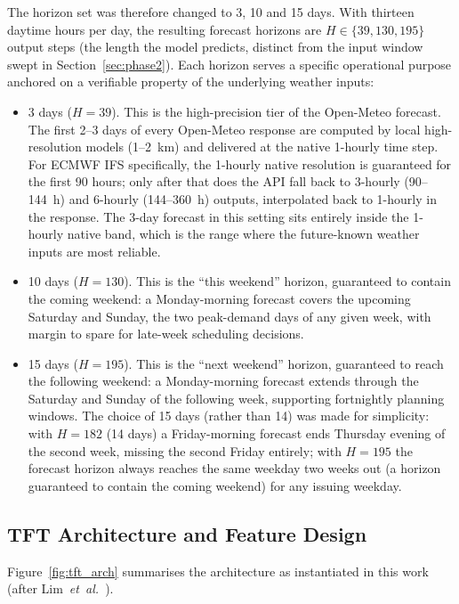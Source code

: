 \documentclass[twocolumn,twoside,a4paper,10pt]{IEEEtran}
\begin{document}
The horizon set was therefore changed to 3, 10 and 15 days. With thirteen daytime hours per day, the resulting forecast horizons are $H \in \{39, 130, 195\}$ output steps (the length the model predicts, distinct from the input window swept in Section~\ref{sec:phase2}). Each horizon serves a specific operational purpose anchored on a verifiable property of the underlying weather inputs:

\begin{itemize}\itemsep0pt
    \item 3 days ($H{=}39$). This is the high-precision tier of the Open-Meteo forecast. The first 2--3 days of every Open-Meteo response are computed by local high-resolution models (1--2~km) and delivered at the native 1-hourly time step. For ECMWF IFS specifically, the 1-hourly native resolution is guaranteed for the first 90 hours; only after that does the API fall back to 3-hourly (90--144~h) and 6-hourly (144--360~h) outputs, interpolated back to 1-hourly in the response. The 3-day forecast in this setting sits entirely inside the 1-hourly native band, which is the range where the future-known weather inputs are most reliable.
    \item 10 days ($H{=}130$). This is the ``this weekend'' horizon, guaranteed to contain the coming weekend: a Monday-morning forecast covers the upcoming Saturday and Sunday, the two peak-demand days of any given week, with margin to spare for late-week scheduling decisions.
    \item 15 days ($H{=}195$). This is the ``next weekend'' horizon, guaranteed to reach the following weekend: a Monday-morning forecast extends through the Saturday and Sunday of the following week, supporting fortnightly planning windows. The choice of 15 days (rather than 14) was made for simplicity: with $H{=}182$ (14 days) a Friday-morning forecast ends Thursday evening of the second week, missing the second Friday entirely; with $H{=}195$ the forecast horizon always reaches the same weekday two weeks out (a horizon guaranteed to contain the coming weekend) for any issuing weekday.
\end{itemize}

\subsection{TFT Architecture and Feature Design}\label{sec:tftfeat}

Figure~\ref{fig:tft_arch} summarises the architecture as instantiated in this work (after Lim~\emph{et~al.}~\cite{LimTFT2021}).
\end{document}
